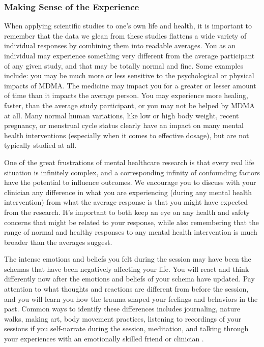 \documentclass[12pt,letterpaper]{article}
\begin{document}
\subsubsection{Making Sense of the Experience}
\label{sectionMakingSense}
When applying scientific studies to one's own life and health, it is important to remember that the data we glean from these studies flattens a wide variety of individual responses by combining them into readable averages. You as an individual may experience something very different from the average participant of any given study, and that may be totally normal and fine. Some examples include: you may be much more or less sensitive to the psychological or physical impacts of MDMA. The medicine may impact you for a greater or lesser amount of time than it impacts the average person. You may experience more healing, faster, than the average study participant, or you may not be helped by MDMA at all. Many normal human variations, like low or high body weight, recent pregnancy, or menstrual cycle status clearly have an impact on many mental health interventions (especially when it comes to effective dosage), but are not typically studied at all.

One of the great frustrations of mental healthcare research is that every real life situation is infinitely complex, and a corresponding infinity of confounding factors have the potential to influence outcomes. We encourage you to discuss with your clinician any difference in what you are experiencing (during any mental health intervention) from what the average response is that you might have expected from the research. It's important to both keep an eye on any health and safety concerns that might be related to your response, while also remembering that the range of normal and healthy responses to any mental health intervention is much broader than the averages suggest.

The intense emotions and beliefs you felt during the session may have been the schemas that have been negatively affecting your life. You will react and think differently now after the emotions and beliefs of your schema have updated. Pay attention to what thoughts and reactions are different from before the session, and you will learn you how the trauma shaped your feelings and behaviors in the past. Common ways to identify these differences includes journaling, nature walks, making art, body movement practices, listening to recordings of your sessions if you self-narrate during the session, meditation, and talking through your experiences with an emotionally skilled friend or clinician \cite{mithoeferManual}.
\end{document}
